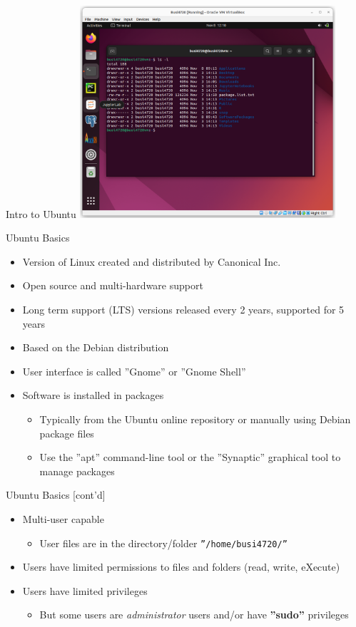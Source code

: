 \documentclass[ignorenonframetext,xcolor=dvipsnames]{beamer}
\begin{document}
\begin{frame}{Intro to Ubuntu}
\centering
\includegraphics[height=3.1in]{screenshot1.png}
\end{frame}

\begin{frame}{Ubuntu Basics}
\begin{itemize}
  \item Version of Linux created and distributed by Canonical Inc. 
  \item Open source and multi-hardware support
  \item Long term support (LTS) versions released every 2 years, supported for 5 years
  \item Based on the Debian distribution
  \item User interface is called ''Gnome'' or ''Gnome Shell''
  \item Software is installed in packages
  \begin{itemize}
    \item Typically from the Ubuntu online repository or manually using Debian package files
    \item Use the ''apt'' command-line tool or the ''Synaptic'' graphical tool to manage packages
  \end{itemize}
\end{itemize}
\end{frame}

\begin{frame}{Ubuntu Basics \small [cont'd]}
\begin{itemize}
  \item Multi-user capable
  \begin{itemize}
    \item User files are in the directory/folder \texttt{''/home/busi4720/''}
  \end{itemize}
  \item Users have limited permissions to files and folders (read, write, eXecute)
  \item Users have limited privileges
  \begin{itemize}
    \item But some users are \emph{administrator} users and/or have \textbf{''sudo''} privileges
  \end{itemize}
\end{itemize}
\end{frame}
\end{document}

